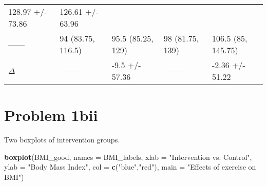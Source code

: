 \documentclass[]{article}
\newenvironment{Shaded}{\begin{snugshade}}{\end{snugshade}}
\newcommand{\DataTypeTok}[1]{\textcolor[rgb]{0.13,0.29,0.53}{#1}}
\newcommand{\KeywordTok}[1]{\textcolor[rgb]{0.13,0.29,0.53}{\textbf{#1}}}
\newcommand{\NormalTok}[1]{#1}
\newcommand{\StringTok}[1]{\textcolor[rgb]{0.31,0.60,0.02}{#1}}
\begin{document}
\begin{longtable}[]{@{}lllll@{}}
\begin{minipage}[t]{0.18\columnwidth}
128.97 +/- 73.86\strut
\end{minipage} & \begin{minipage}[t]{0.15\columnwidth}\raggedright
126.61 +/- 63.96\strut
\end{minipage}\tabularnewline
\begin{minipage}[t]{0.15\columnwidth}\raggedright
------\strut
\end{minipage} & \begin{minipage}[t]{0.20\columnwidth}\raggedright
94 (83.75, 116.5)\strut
\end{minipage} & \begin{minipage}[t]{0.18\columnwidth}\raggedright
95.5 (85.25, 129)\strut
\end{minipage} & \begin{minipage}[t]{0.18\columnwidth}\raggedright
98 (81.75, 139)\strut
\end{minipage} & \begin{minipage}[t]{0.15\columnwidth}\raggedright
106.5 (85, 145.75)\strut
\end{minipage}\tabularnewline
\begin{minipage}[t]{0.15\columnwidth}\raggedright
\(\Delta\)\strut
\end{minipage} & \begin{minipage}[t]{0.20\columnwidth}\raggedright
--------\strut
\end{minipage} & \begin{minipage}[t]{0.18\columnwidth}\raggedright
-9.5 +/- 57.36\strut
\end{minipage} & \begin{minipage}[t]{0.18\columnwidth}\raggedright
--------\strut
\end{minipage} & \begin{minipage}[t]{0.15\columnwidth}\raggedright
-2.36 +/- 51.22\strut
\end{minipage}\tabularnewline
\bottomrule
\end{longtable}

\hypertarget{problem-1bii}{%
\section{Problem 1bii}\label{problem-1bii}}

Two boxplots of intervention groups.

\begin{Shaded}
\begin{Highlighting}[]
\KeywordTok{boxplot}\NormalTok{(BMI_good,}
        \DataTypeTok{names =}\NormalTok{ BMI_labels,}
        \DataTypeTok{xlab =} \StringTok{"Intervention vs. Control"}\NormalTok{,}
        \DataTypeTok{ylab =} \StringTok{"Body Mass Index"}\NormalTok{, }
        \DataTypeTok{col =} \KeywordTok{c}\NormalTok{(}\StringTok{"blue"}\NormalTok{,}\StringTok{"red"}\NormalTok{), }
        \DataTypeTok{main =} \StringTok{"Effects of exercise on BMI"}\NormalTok{)}
\end{Highlighting}
\end{Shaded}
\end{document}
